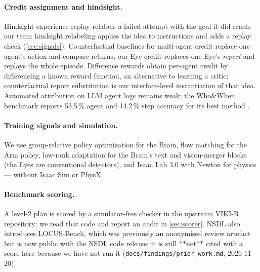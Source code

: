 \paragraph{Credit assignment and hindsight.}
Hindsight experience replay \citep{andrychowicz2017her} relabels a failed attempt with the goal it did reach; our team hindsight relabeling applies the idea to instructions and adds a replay check (\cref{sec:signals}).
Counterfactual baselines for multi-agent credit \citep{foerster2018coma} replace one agent's action and compare returns; our Eye credit replaces one Eye's \emph{report} and replays the whole episode.
Difference rewards \citep{castellini2022difference} obtain per-agent credit by differencing a known reward function, an alternative to learning a critic; counterfactual report substitution is our interface-level instantiation of that idea.
Automated attribution on LLM agent logs remains weak: the Who\&When benchmark reports 53.5\,\% agent and 14.2\,\% step accuracy for its best method \citep{zhang2025whowhen}.

\paragraph{Training signals and simulation.}
We use group-relative policy optimization \citep{shao2024deepseekmath} for the Brain, flow matching \citep{lipman2023flowmatching} for the Arm policy, low-rank adaptation \citep{hu2022lora} for the Brain's text and vision-merger blocks (the Eyes are conventional detectors), and Isaac Lab 3.0 with Newton \citep{mittal2025isaaclab} for physics --- without Isaac Sim or PhysX. 

\paragraph{Benchmark scoring.}
A level-2 plan is scored by a simulator-free checker in the upstream VIKI-R repository; we read that code and report an audit in \cref{sec:scorer}.
NSDL also introduces LOCUS-Bench, which was previously an anonymised review artefact but is now public with the NSDL code release; it is still **not** cited with a score here because we have not run it (\texttt{docs/findings/prior\_work.md}, 2026-11-20).

